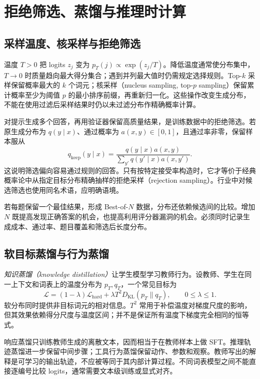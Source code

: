\setcounter{chapter}{12} %
\chapter{拒绝筛选、蒸馏与推理时计算}
\label{ch:distillation}

\section{采样温度、核采样与拒绝筛选}

温度 $T>0$ 把 logits $z_j$ 变为 $p_T(j)\propto\exp(z_j/T)$。降低温度通常使分布集中，$T\to0$ 时质量趋向最大得分集合；遇到并列最大值时仍需规定选择规则。Top-$k$ 采样保留概率最大的 $k$ 个词元；核采样（nucleus sampling, top-$p$ sampling）保留累计概率至少为阈值 $p$ 的最小排序前缀，再重新归一化。这些操作改变生成分布，不能在使用过滤后采样结果时仍以未过滤分布作精确概率计算。

对提示生成多个回答，再用验证器保留高质量结果，是训练数据中的拒绝筛选。若原生成分布为 $q(y\mid x)$、通过概率为 $a(x,y)\in[0,1]$，且通过率非零，保留样本服从
\begin{equation}
q_{\mathrm{keep}}(y\mid x)=\frac{q(y\mid x)a(x,y)}{\sum_{y'}q(y'\mid x)a(x,y')}.
\label{eq:filter-distribution}
\end{equation}
这说明筛选偏向容易通过规则的回答。只有按特定接受率构造时，它才等价于经典概率论中从指定目标分布精确抽样的拒绝采样（rejection sampling）。行业中对候选筛选也使用同名术语，应明确语境。

若每题保留一个最佳结果，形成 Best-of-$N$ 数据，分布还依赖候选间的比较。增加 $N$ 既提高发现正确答案的机会，也提高利用评分器漏洞的机会。必须同时记录生成成本、通过率、题目覆盖和筛选后长度分布。

\section{软目标蒸馏与行为蒸馏}

\emph{知识蒸馏（knowledge distillation）}让学生模型学习教师行为。设教师、学生在同一上下文和词表上的温度分布为 $p_T,q_T$，一个常见目标为
\[
\mathcal L=(1-\lambda)\mathcal L_{\mathrm{hard}}
+\lambda T^2D_{\mathrm{KL}}(p_T\|q_T),\qquad 0\le\lambda\le1.
\]
软分布同时提供非目标词元的相对信息。$T^2$ 常用于补偿温度对梯度尺度的影响，但其效果依赖得分尺度与温度区间；并不是保证所有温度下梯度完全相同的恒等式\cite{distill}。

响应蒸馏只训练教师生成的离散文本，因而相当于在教师样本上做 SFT。推理轨迹蒸馏进一步保留中间步骤；工具行为蒸馏保留动作、参数和观察。教师写出的解释是可学习的输出轨迹，不应被等同于其内部计算过程。不同词表模型之间不能直接逐编号比较 logits，通常需要文本级训练或显式对齐。

